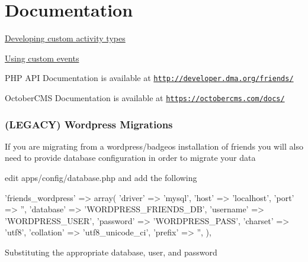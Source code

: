 \section*{Documentation}

\hyperlink{md_docs_ACTIVITY-TYPES}{Developing custom activity types}

\hyperlink{md_docs_EVENTS}{Using custom events}

P\+H\+P A\+P\+I Documentation is available at \href{http://developer.dma.org/friends/}{\tt http\+://developer.\+dma.\+org/friends/}

October\+C\+M\+S Documentation is available at \href{https://octobercms.com/docs/}{\tt https\+://octobercms.\+com/docs/}

\subsubsection*{(L\+E\+G\+A\+C\+Y) Wordpress Migrations}

If you are migrating from a wordpress/badgeos installation of friends you will also need to provide database configuration in order to migrate your data


\begin{DoxyItemize}
\item edit apps/config/database.\+php and add the following 
\begin{DoxyPre}
        'friends\_wordpress' => array(
            'driver'    => 'mysql',
            'host'      => 'localhost',
            'port'      => '', 
            'database'  => 'WORDPRESS\_FRIENDS\_DB',
            'username'  => 'WORDPRESS\_USER',
            'password'  => 'WORDPRESS\_PASS',
            'charset'   => 'utf8',
            'collation' => 'utf8\_unicode\_ci',
            'prefix'    => '', 
        ), 
\end{DoxyPre}
 Substituting the appropriate database, user, and password 
\end{DoxyItemize}